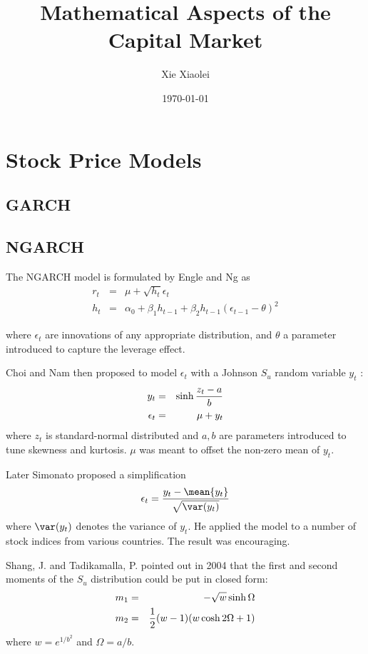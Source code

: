 \documentclass{book}
\title{Mathematical Aspects of the Capital Market}
\author{Xie Xiaolei}
\date{\today}
\begin{document}
\maketitle
\tableofcontents

\chapter{Stock Price Models}
\section{GARCH}

\section{NGARCH}\label{sec:ngarch}
The NGARCH model is formulated by Engle and Ng \cite{Engle1993} as
\begin{eqnarray*}
  r_t &=& \mu + \sqrt{h_t} \epsilon_t \\
  h_t &=& \alpha_0 + \beta_1 h_{t-1} + \beta_2
  h_{t-1}(\epsilon_{t-1} - \theta)^2
\end{eqnarray*}

where $\epsilon_t$ are innovations of any appropriate distribution,
and $\theta$ a parameter introduced to capture the leverage effect.

Choi and Nam \cite{Choi2008} then proposed to model $\epsilon_t$ with
a Johnson $S_u$ random variable $y_t$ \cite{Johnson1949}:
\begin{eqnarray*}
  y_t &=& \sinh{z_t - a \over b} \\
  \epsilon_t &=& \mu + y_t
\end{eqnarray*}
where $z_t$ is standard-normal distributed and $a, b$ are parameters
introduced to tune skewness and kurtosis. $\mu$ was meant to offset
the non-zero mean of $y_t$.

Later Simonato proposed a simplification \cite{Simonato2012}
\[
\epsilon_t = {y_t - \mean{y_t} \over \sqrt{\var(y_t)}}
\]
where $\var(y_t)$ denotes the variance of $y_t$. He applied the model
to a number of stock indices from various countries. The result was
encouraging.

Shang, J. and Tadikamalla, P. pointed out in 2004 \cite{Shang2004}
that the first and second moments of the $S_u$ distribution could be
put in closed form:
\begin{eqnarray*}
  m_1 &=& -\sqrt{w} \sinh\Omega \\
  m_2 &=& {1 \over 2} (w - 1) (w\cosh{2\Omega} + 1)
\end{eqnarray*}
where $w = e^{1/b^2}$ and $\Omega = a/b$.
\end{document}
